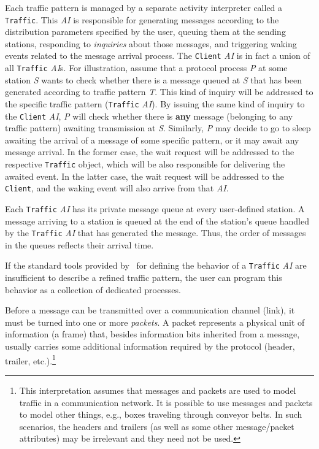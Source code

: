 Each traffic pattern is managed by a separate activity interpreter called
a {\tt Traffic}.
This {\em AI\/} is responsible for generating messages according to the
distribution parameters specified by the user, queuing them at the
sending stations, responding to {\em inquiries\/} about those
messages, and triggering waking events related to the message arrival
process.
The {\tt Client} {\em AI\/} is in fact a union of all {\tt Traffic}
{\em AI\/}s.
For illustration, assume that a protocol process {\em P\/} at some
station {\em S\/} wants to check whether there is a message queued at
{\em S\/} that
has been generated according to traffic pattern {\em T}.
This kind of inquiry will be addressed to the specific traffic pattern
({\tt Traffic} {\em AI\/}).
By issuing the same kind of inquiry to the {\tt Client} {\em AI},
{\em P\/} will check
whether there is {\bf any} message (belonging to any traffic pattern)
awaiting transmission at {\em S}.
Similarly, {\em P\/} may decide to go to sleep awaiting the arrival of
a message of some specific pattern, or it may await any message arrival.
In the former case, the wait request will be addressed to the respective
{\tt Traffic} object, which will be also responsible for delivering the
awaited event.
In the latter case, the wait request will be addressed to the {\tt Client},
and the waking event will also arrive from that {\em AI}.

Each {\tt Traffic}  {\em AI\/}
has its private message queue at every user-defined station.
A message arriving to a station is queued at the end of the station's queue 
handled by the {\tt Traffic} {\em AI\/} that has generated the message.
Thus, the order of messages in the queues reflects their arrival time.

If the standard tools provided by \smurph\ for defining the behavior of a
{\tt Traffic} {\em AI\/} are insufficient to describe a refined traffic
pattern, the user can program this behavior as a collection of dedicated
processes.

Before a message can be transmitted over a communication
channel (link), it must be turned into one or more {\em packets}.
A packet represents a physical unit of information (a frame) that,
besides information bits inherited from a message,
usually carries some additional information required
by the protocol (header, trailer, etc.).\footnote{This interpretation assumes
that messages and packets are used to model traffic in a communication network.
It is possible to use messages and packets to model other things, e.g.,
boxes traveling through conveyor belts.
In such scenarios, the headers and trailers (as well as some other
message/packet attributes) may be irrelevant and they need not be used.}

